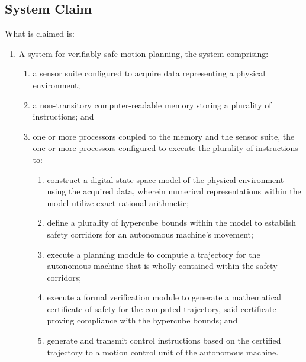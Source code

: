 \documentclass{article}
\begin{document}
\subsection{System Claim}
\noindent What is claimed is:
\begin{enumerate}
    \item A system for verifiably safe motion planning, the system comprising:
    \begin{enumerate}
        \item[(a)] a sensor suite configured to acquire data representing a physical environment;
        \item[(b)] a non-transitory computer-readable memory storing a plurality of instructions; and
        \item[(c)] one or more processors coupled to the memory and the sensor suite, the one or more processors configured to execute the plurality of instructions to:
        \begin{enumerate}
            \item[(i)] construct a digital state-space model of the physical environment using the acquired data, wherein numerical representations within the model utilize exact rational arithmetic;
            \item[(ii)] define a plurality of hypercube bounds within the model to establish safety corridors for an autonomous machine's movement;
            \item[(iii)] execute a planning module to compute a trajectory for the autonomous machine that is wholly contained within the safety corridors;
            \item[(iv)] execute a formal verification module to generate a mathematical certificate of safety for the computed trajectory, said certificate proving compliance with the hypercube bounds; and
            \item[(v)] generate and transmit control instructions based on the certified trajectory to a motion control unit of the autonomous machine.
        \end{enumerate}
    \end{enumerate}
\end{enumerate}
\end{document}
